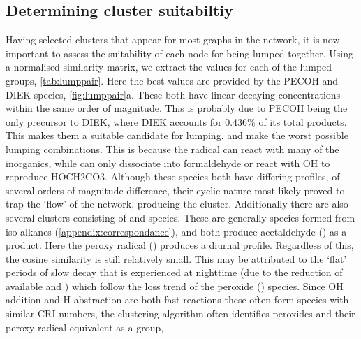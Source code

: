 \subsection{Determining cluster suitabiltiy}
Having selected clusters that appear for most graphs in the network, it is now important to assess the suitability of each node for being lumped together. Using a normalised similarity matrix, we extract the values for each of the lumped groups, \autoref{tab:lumppair}. Here the best values are provided by the PECOH and DIEK species, \autoref{fig:lumppair}a. These both have linear decaying concentrations within the same order of magnitude. This is probably due to PECOH being the only precursor to DIEK, where DIEK accounts for 0.436\% of its total products. This makes them a suitable candidate for lumping.
 and  make the worst possible lumping combinations. This is because the radical  can react with many of the inorganics, while  can only dissociate into formaldehyde or react with OH to reproduce HOCH2CO3. Although these species both have differing profiles, of several orders of magnitude difference, their cyclic nature  most likely proved to trap the `flow' of the network, producing the cluster. Additionally there are also several clusters consisting of  and  species. These are generally species formed from iso-alkanes (\autoref{appendix:correspondance}), and both produce acetaldehyde () as a product. Here the peroxy radical () produces a diurnal profile. Regardless of this, the cosine similarity is still relatively small. This may be attributed to the `flat' periods of slow decay that is experienced at nighttime (due to the reduction of available  and ) which follow the loss trend of the peroxide () species. Since OH addition and H-abstraction are both fast reactions these often form species with similar CRI numbers, the clustering algorithm often identifies peroxides and their peroxy radical equivalent as a group, . \\


